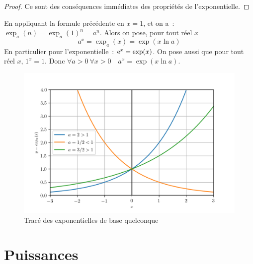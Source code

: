 \begin{proof}
  Ce sont des conséquences immédiates des propriétés de l'exponentielle.
\end{proof}
%
En appliquant la formule précédente en \(x=1\), et on a~: \(\exp_a(n)=\exp_a(1)^n=a^n\). Alors on pose, pour tout réel \(x\)
\begin{equation}
  a^x=\exp_a(x)=\exp(x \ln a)
\end{equation}
En particulier pour l'exponentielle~: \(\operatorname{e}^x=\exp(x)\). On pose aussi que pour tout réel \(x\), \(1^x=1\). Donc \(\forall a>0 \ \forall x>0 \quad a^x=\exp(x \ln a)\).
%
\begin{figure}
  \centering
  \includegraphics[scale=0.8]{expa.png}
  \caption{Tracé des exponentielles de base quelconque}
  \label{fig:traceexpa}
\end{figure}
%
\section{Puissances}
\label{sec:chap1-puissances}
